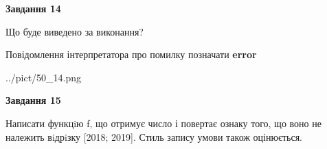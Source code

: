 \documentclass[11pt, ukrainian]{article}
\begin{document}
{\begin {large}
{\begin {center}\textbf{Завдання 14}\end {center}}\par
Що буде виведено за виконання? \par
Повідомлення інтерпретатора про помилку позначати \textbf{error}

\begin{center}
	{../pict/50_14.png}
\end{center}
\newpage

{\begin {center}\textbf{Завдання 15}\end {center}}\par

Написати функцiю f, що отримує число і повертає ознаку того, що воно не належить вiдрiзку [2018; 2019]. Стиль запису умови також оцінюється.\par
\newpage

\end {large}}
\end{document}
